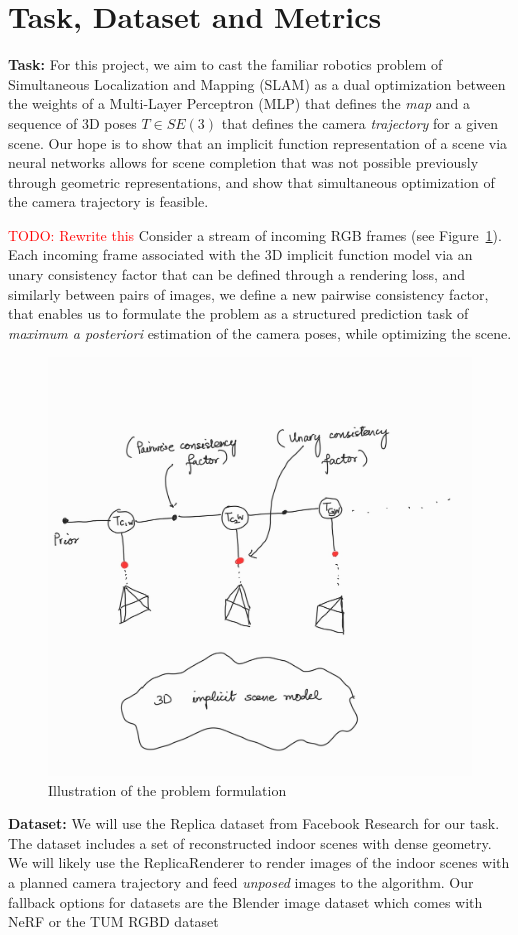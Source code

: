 \documentclass[15pt,letterpaper]{article}
\newcommand{\todo}[1]{\textcolor{red}{TODO: #1}}
\begin{document}
\section{Task, Dataset and Metrics}%
\label{sec:Task, Dataset and Metrics}
\textbf{Task:} For this project, we aim to cast the familiar robotics problem of Simultaneous Localization and Mapping (SLAM) as a dual optimization between the weights of a Multi-Layer Perceptron (MLP) that defines the \emph{map} and a sequence of 3D poses $T \in SE(3)$ that defines the camera \emph{trajectory} for a given scene. Our hope is to show that an implicit function representation of a scene via neural networks allows for scene completion that was not possible previously through geometric representations, and show that simultaneous optimization of the camera trajectory is feasible.

\todo{Rewrite this}
Consider a stream of incoming RGB frames (see Figure~\ref{fig:structured-prediction}). Each incoming frame associated with the 3D implicit function model via an unary consistency factor that can be defined through a rendering loss, and similarly between pairs of images, we define a new pairwise consistency factor, that enables us to formulate the problem as a structured prediction task of \emph{maximum a posteriori} estimation of the camera poses, while optimizing the scene.
\begin{figure}[htpb]
    \centering
    \includegraphics[width=0.6\linewidth]{structured-prediction.jpeg}
    \caption{Illustration of the problem formulation}%
    \label{fig:structured-prediction}
\end{figure}

\textbf{Dataset:} We will use the Replica dataset \cite{replica19arxiv} from Facebook Research for our task. The dataset includes a set of reconstructed indoor scenes with dense geometry. We will likely use the ReplicaRenderer to render images of the indoor scenes with a planned camera trajectory and feed \emph{unposed} images to the algorithm. Our fallback options for datasets are the Blender image dataset which comes with NeRF \cite{nerf} or the TUM RGBD dataset \cite{sturmBenchmarkEvaluationRGBD2012}
\end{document}
